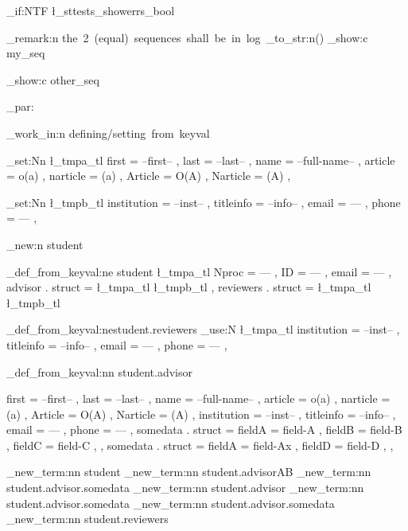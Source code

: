 \documentclass{article}
\begin{document}
\bool_if:NTF \l_sttests_showerrs_bool
  {
    \sttests_remark:n {the~2~(equal)~sequences~shall~be~in~log~\tl_to_str:n{(\show)}}
   \seq_show:c {my_seq}

   \seq_show:c {other_seq}
  }
  {
  }


\sttests_par:

\sttests_work_in:n {defining/setting~from~keyval}

        \tl_set:Nn \l_tmpa_tl {
          first = --first-- ,
          last = --last-- ,
          name = --full-name-- ,
          article = o(a) ,
          narticle = (a) ,
          Article = O(A) ,
          Narticle = (A) ,
        }

        \tl_set:Nn \l_tmpb_tl {
          institution = --inst-- ,
          titleinfo = --info-- ,
          email = --- ,
          phone = --- ,
        }

        \starray_new:n {student}

        \starray_def_from_keyval:ne {student}
        {
          \l_tmpa_tl
          Nproc = --- ,
          ID = --- ,
          email = --- ,
          advisor . struct = {
            \l_tmpa_tl
            \l_tmpb_tl
          } ,
          reviewers . struct = {
            \l_tmpa_tl
            \l_tmpb_tl
          }
        }

        \starray_def_from_keyval:ne{student.reviewers}
        {
          \tl_use:N \l_tmpa_tl
          institution = --inst-- ,
          titleinfo = --info-- ,
          email = --- ,
          phone = --- ,
        }

        \starray_def_from_keyval:nn {student.advisor}
        {
          first = --first-- ,
          last = --last-- ,
          name = --full-name-- ,
          article = o(a) ,
          narticle = (a) ,
          Article = O(A) ,
          Narticle = (A) ,
          institution = --inst-- ,
          titleinfo = --info-- ,
          email = --- ,
          phone = --- ,
          somedata . struct = {
            fieldA = field-A ,
            fieldB = field-B ,
            fieldC = field-C ,
          } ,
          somedata . struct = {
            fieldA = field-Ax ,
            fieldD = field-D ,
          } ,
          
        }


        \starray_new_term:nn {student}{}
        \starray_new_term:nn {student.advisor}{AB}
        \starray_new_term:nn {student.advisor.somedata}{}
        \starray_new_term:nn {student.advisor}{}
        \starray_new_term:nn {student.advisor.somedata}{}
        \starray_new_term:nn {student.advisor.somedata}{}
        \starray_new_term:nn {student.reviewers}{}
\end{document}
